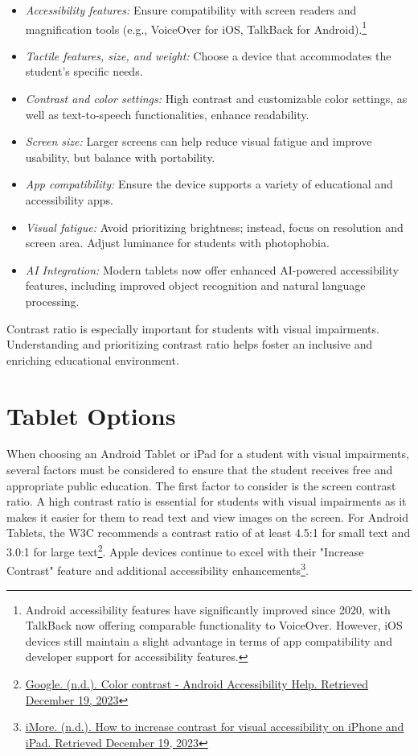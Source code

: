 \begin{itemize}
    \item \emph{Accessibility features:} Ensure compatibility with screen readers and magnification tools (e.g., VoiceOver for iOS, TalkBack for Android).\footnote{Android accessibility features have significantly improved since 2020, with TalkBack now offering comparable functionality to VoiceOver. However, iOS devices still maintain a slight advantage in terms of app compatibility and developer support for accessibility features.}
    \item \emph{Tactile features, size, and weight:} Choose a device that accommodates the student's specific needs.
    \item \emph{Contrast and color settings:} High contrast and customizable color settings, as well as text-to-speech functionalities, enhance readability.
    \item \emph{Screen size:} Larger screens can help reduce visual fatigue and improve usability, but balance with portability.
    \item \emph{App compatibility:} Ensure the device supports a variety of educational and accessibility apps.
    \item \emph{Visual fatigue:} Avoid prioritizing brightness; instead, focus on resolution and screen area. Adjust luminance for students with photophobia.
    \item \emph{AI Integration:} Modern tablets now offer enhanced AI-powered accessibility features, including improved object recognition and natural language processing.
\end{itemize}

Contrast ratio is especially important for students with visual impairments. Understanding and prioritizing contrast ratio helps foster an inclusive and enriching educational environment.

\section{Tablet Options}\label{tab:tablet-options}
When choosing an Android Tablet or iPad for a student with visual impairments, several factors must be considered to ensure that the student receives free and appropriate public education. The first factor to consider is the screen contrast ratio. A high contrast ratio is essential for students with visual impairments as it makes it easier for them to read text and view images on the screen. For Android Tablets, the W3C recommends a contrast ratio of at least 4.5:1 for small text and 3.0:1 for large text\footnote{\raggedright \href{https://support.google.com/accessibility/android/answer/7158390?hl=en}{Google. (n.d.). Color contrast - Android Accessibility Help. Retrieved December 19, 2023}}. Apple devices continue to excel with their "Increase Contrast" feature and additional accessibility enhancements\footnote{\raggedright \href{https://www.imore.com/how-increase-contrast-visual-accessibility-iphone-and-ipad}{iMore. (n.d.). How to increase contrast for visual accessibility on iPhone and iPad. Retrieved December 19, 2023}}.

